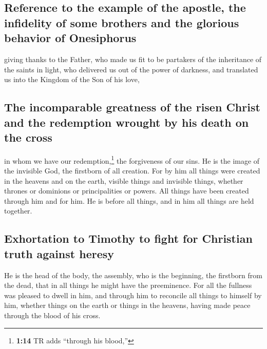 \hypertarget{reference-to-the-example-of-the-apostle-the-infidelity-of-some-brothers-and-the-glorious-behavior-of-onesiphorus}{%
\subsection{Reference to the example of the apostle, the infidelity of
some brothers and the glorious behavior of
Onesiphorus}\label{reference-to-the-example-of-the-apostle-the-infidelity-of-some-brothers-and-the-glorious-behavior-of-onesiphorus}}

 giving thanks to the Father, who made us fit to be
partakers of the inheritance of the saints in light,  who
delivered us out of the power of darkness, and translated us into the
Kingdom of the Son of his love,

\hypertarget{the-incomparable-greatness-of-the-risen-christ-and-the-redemption-wrought-by-his-death-on-the-cross}{%
\subsection{The incomparable greatness of the risen Christ and the
redemption wrought by his death on the
cross}\label{the-incomparable-greatness-of-the-risen-christ-and-the-redemption-wrought-by-his-death-on-the-cross}}

 in whom we have our redemption,\footnote{\textbf{1:14}
  TR adds ``through his blood,''} the forgiveness of our sins.
 He is the image of the invisible God, the firstborn of
all creation.  For by him all things were created in the
heavens and on the earth, visible things and invisible things, whether
thrones or dominions or principalities or powers. All things have been
created through him and for him.  He is before all
things, and in him all things are held together.

\hypertarget{exhortation-to-timothy-to-fight-for-christian-truth-against-heresy}{%
\subsection{Exhortation to Timothy to fight for Christian truth against
heresy}\label{exhortation-to-timothy-to-fight-for-christian-truth-against-heresy}}

 He is the head of the body, the assembly, who is the
beginning, the firstborn from the dead, that in all things he might have
the preeminence.  For all the fullness was pleased to
dwell in him,  and through him to reconcile all things to
himself by him, whether things on the earth or things in the heavens,
having made peace through the blood of his cross.

